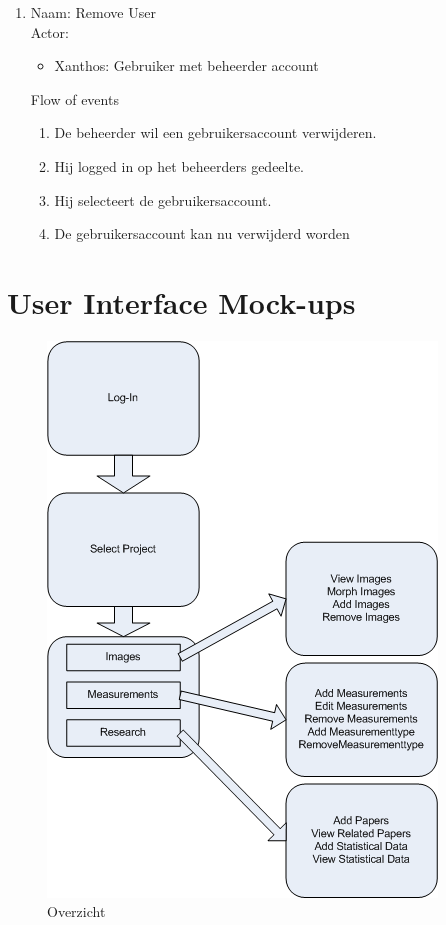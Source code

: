 \begin{enumerate}
\item   Naam: Remove User  \\
	Actor:
	\begin{itemize}
		\item Xanthos: Gebruiker met beheerder account
	\end{itemize}
	Flow of events
	\begin{enumerate}
	  \item De beheerder wil een gebruikersaccount verwijderen.
		\item Hij logged in op het beheerders gedeelte.
		\item Hij selecteert de gebruikersaccount.
		\item De gebruikersaccount kan nu verwijderd worden
	\end{enumerate}
	

\end{enumerate}

\section{User Interface Mock-ups}
\begin{figure}[htp]
\begin{center}
	\includegraphics[scale=0.65]{NewConcept}
\caption{Overzicht}
\label{default}
\end{center}
\end{figure}

